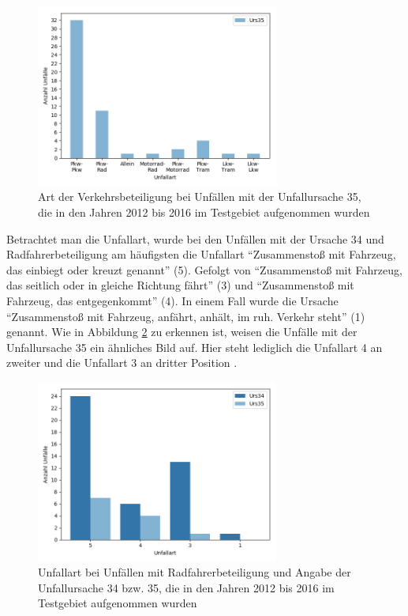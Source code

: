 \begin{savenotes}
	\begin{figure}[H]
		\centering
		\includegraphics[width=8cm,height=6cm]{figures/Urs35_Beteiligung}
		\caption[Art der Verkehrsbeteiligung bei Unfällen mit der Unfallursache 35, die in den Jahren 2012 bis 2016 im Testgebiet aufgenommen wurden]{Art der Verkehrsbeteiligung bei Unfällen mit der Unfallursache 35, die in den Jahren 2012 bis 2016 im Testgebiet aufgenommen wurden}\label{fig:Urs35_Verkehrsbeteiligung}
	\end{figure}
\end{savenotes}

Betrachtet man die Unfallart, wurde bei den Unfällen mit der Ursache 34 und Radfahrerbeteiligung am häufigsten die Unfallart \enquote{Zusammenstoß mit Fahrzeug, das einbiegt oder kreuzt genannt} (5). Gefolgt von \enquote{Zusammenstoß mit Fahrzeug, das seitlich oder in gleiche Richtung fährt} (3) und \enquote{Zusammenstoß mit Fahrzeug, das entgegenkommt} (4). In einem Fall wurde die Ursache \enquote{Zusammenstoß mit Fahrzeug, anfährt, anhält, im ruh. Verkehr steht} (1) genannt. Wie in Abbildung \ref{fig:Unfallart_Urs34_Urs35_Radbeteiligung} zu erkennen ist, weisen die Unfälle mit der Unfallursache 35 ein ähnliches Bild auf. Hier steht lediglich die Unfallart 4 an zweiter und die Unfallart 3 an dritter Position .

\begin{savenotes}
	\begin{figure}[H]
		\centering
		\includegraphics[width=8cm,height=6cm]{figures/Art_Urs34_Urs35}
		\caption[Unfallart bei Unfällen mit Radfahrerbeteiligung und Angabe der Unfallursache 34 bzw. 35, die in den Jahren 2012 bis 2016 im Testgebiet aufgenommen wurden]{Unfallart bei Unfällen mit Radfahrerbeteiligung und Angabe der Unfallursache 34 bzw. 35, die in den Jahren 2012 bis 2016 im Testgebiet aufgenommen wurden}\label{fig:Unfallart_Urs34_Urs35_Radbeteiligung}
	\end{figure}
\end{savenotes}

